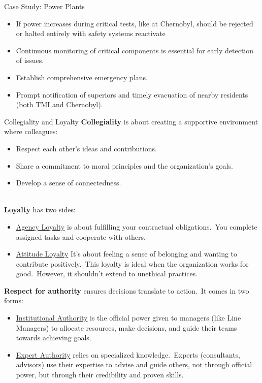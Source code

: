 \documentclass[11pt]{beamer}
\begin{document}
\begin{frame}[t,allowframebreaks]{Case Study: Power Plants}
\begin{itemize}
            \item If power increases during critical tests, like at Chernobyl, should be rejected or halted entirely
            with safety systems reactivate
            \item Continuous monitoring of critical components is essential for early detection of issues.
            \item Establish comprehensive emergency plans.
            \item Prompt notification of superiors and timely evacuation of nearby residents (both TMI and Chernobyl).
        \end{itemize}
    \end{frame}

    \begin{frame}[t,allowframebreaks]{Collegiality and Loyalty}
        \textbf{Collegiality} is about creating a supportive environment where colleagues:\\[5pt]
        \begin{itemize}
            \item \alert{Respect} each other's ideas and contributions.
            \item Share a \alert{commitment} to moral principles and the organization's goals.
            \item Develop a sense of \alert{connectedness}.
        \end{itemize}
        \\[10pt]
        \textbf{Loyalty} has two sides:\\[5pt]
        \begin{itemize}
            \item \underline{Agency Loyalty} is about fulfilling your contractual obligations.\ You complete assigned
            tasks and
            cooperate with others.
            \item \underline{Attitude Loyalty} It's about feeling a sense of belonging and wanting to contribute
            positively.\ This loyalty is ideal when the organization works for good.\ However, it shouldn't extend to
            unethical practices.
        \end{itemize}

        \framebreak

        \textbf{Respect for authority} ensures decisions translate to action.\ It comes in two forms:\\[5pt]
        \begin{itemize}
            \item \underline{Institutional Authority} is the official power given to managers (like Line Managers) to
            allocate resources, make decisions, and guide their teams towards achieving goals.
            \item \underline{Expert Authority} relies on specialized knowledge.\ Experts (consultants, advisors) use
            their expertise to advise and guide others, not through official power, but through their credibility and
            proven skills.
        \end{itemize}
    \end{frame}
\end{document}
